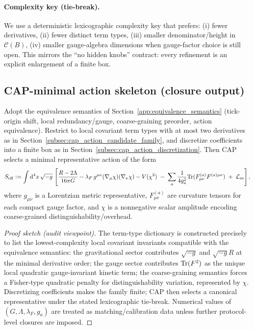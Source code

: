 \paragraph{Complexity key (tie-break).}
\AuditTag We use a deterministic lexicographic complexity key that prefers:
(i) fewer derivatives, (ii) fewer distinct term types, (iii) smaller denominator/height in $\mathcal{C}(B)$, (iv) smaller gauge-algebra dimensions when gauge-factor choice is still open.
This mirrors the ``no hidden knobs'' contract: every refinement is an explicit enlargement of a finite box.

\subsection{CAP-minimal action skeleton (closure output)}
\label{subsec:cap_minimal_action_output}

\begin{proposition}
\label{prop:cap_minimal_action_skeleton}
Adopt the equivalence semantics of Section~\ref{app:equivalence_semantics} (tick-origin shift, local redundancy/gauge, coarse-graining preorder, action equivalence).
Restrict to local covariant term types with at most two derivatives as in Section~\ref{subsec:cap_action_candidate_family}, and discretize coefficients into a finite box as in Section~\ref{subsec:cap_action_discretization}.
Then CAP selects a minimal representative action of the form
\begin{equation}
\label{eq:cap_minimal_action_skeleton}
S_{\mathrm{eff}}
:=\int \mathrm{d}^{4}x\,\sqrt{-g}\,
\left[
\frac{R-2\Lambda}{16\pi G}
-\lambda_F\, g^{\mu\nu}(\nabla_\mu\chi)(\nabla_\nu\chi)
-V(\chi^{2})
\;-\;\sum_{a}\frac{1}{4g_a^2}\mathrm{Tr}(F^{(a)}_{\mu\nu}F^{(a)\mu\nu})
\;+\;\mathcal{L}_{m}
\right],
\end{equation}
where $g_{\mu\nu}$ is a Lorentzian metric representative, $F^{(a)}_{\mu\nu}$ are curvature tensors for each compact gauge factor, and $\chi$ is a nonnegative scalar amplitude encoding coarse-grained distinguishability/overhead.
\end{proposition}

\begin{proof}[Proof sketch (audit viewpoint)]
The term-type dictionary is constructed precisely to list the lowest-complexity local covariant invariants compatible with the equivalence semantics:
the gravitational sector contributes $\sqrt{-g}$ and $\sqrt{-g}R$ at the minimal derivative order;
the gauge sector contributes $\mathrm{Tr}(F^2)$ as the unique local quadratic gauge-invariant kinetic term;
the coarse-graining semantics forces a Fisher-type quadratic penalty for distinguishability variation, represented by $\chi$.
Discretizing coefficients makes the family finite; CAP then selects a canonical representative under the stated lexicographic tie-break.
Numerical values of $(G,\Lambda,\lambda_F,g_a)$ are treated as matching/calibration data unless further protocol-level closures are imposed.
\end{proof}

